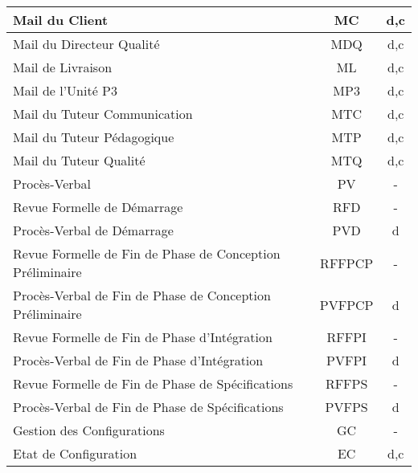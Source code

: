 \begin{longtable}{|p{12cm}|c|c|}
    \hline
    \hspace{2cm} Mail du Client & MC & d,c\\
    \hline
    \hspace{2cm} Mail du Directeur Qualité & MDQ & d,c\\
    \hline
    \hspace{2cm} Mail de Livraison & ML & d,c\\
    \hline
    \hspace{2cm} Mail de l'Unité P3 & MP3 & d,c\\
    \hline
    \hspace{2cm} Mail du Tuteur Communication & MTC & d,c\\
    \hline
    \hspace{2cm} Mail du Tuteur Pédagogique & MTP & d,c\\
    \hline
    \hspace{2cm} Mail du Tuteur Qualité & MTQ & d,c\\
    \hline
    \hspace{1cm} Procès-Verbal & PV & -\\
    \hline
    \hspace{2cm} Revue Formelle de Démarrage & RFD & -\\
    \hline
    \hspace{3cm} Procès-Verbal de Démarrage & PVD & d\\
    \hline
    \hspace{2cm} Revue Formelle de Fin de Phase de Conception Préliminaire & RFFPCP & -\\
    \hline
    \hspace{3cm} Procès-Verbal de Fin de Phase de Conception Préliminaire & PVFPCP & d\\
    \hline
    \hspace{2cm} Revue Formelle de Fin de Phase d'Intégration & RFFPI & -\\
    \hline
    \hspace{3cm} Procès-Verbal de Fin de Phase d'Intégration & PVFPI & d\\
    \hline
    \hspace{2cm} Revue Formelle de Fin de Phase de Spécifications & RFFPS & -\\
    \hline
    \hspace{3cm} Procès-Verbal de Fin de Phase de Spécifications & PVFPS & d\\
    \hline
    Gestion des Configurations & GC & -\\
    \hline
    \hspace{1cm} Etat de Configuration & EC & d,c\\

\end{longtable}
